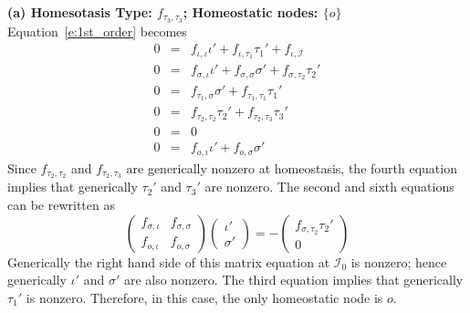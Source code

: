 \documentclass[a4paper,fleqn]{cas-dc}
\newcommand{\II}{{\mathcal I}}
\begin{document}
\noindent
\textbf{(a) Homesotasis Type: $f_{\tau_3,\tau_3}$; 
Homeostatic nodes: $\{o\}$}  \\
Equation~\eqref{e:1st_order} becomes
\begin{equation}  \label{e:1st_orderA}
\begin{array}{rcl}
0 & = & f_{\iota,\iota}\iota' + f_{\iota,\tau_1}\tau_1' + f_{\iota,\II} \\
0 & = & f_{\sigma,\iota}\iota' + f_{\sigma,\sigma}\sigma' + f_{\sigma,\tau_2}\tau_2' \\
0 & = & f_{\tau_1,\sigma}\sigma' + f_{\tau_1,\tau_1}\tau_1' \\
0 & = & f_{\tau_2,\tau_2}\tau_2' + f_{\tau_2,\tau_3}\tau_3' \\
0 & = & 0 \\
0 & = & f_{o,\iota}\iota' + f_{o,\sigma}\sigma'
\end{array}
\end{equation}
Since $f_{\tau_2,\tau_2}$ and $f_{\tau_2,\tau_3}$ are generically nonzero at homeostasis, the 
fourth equation implies that generically $\tau_2'$ and $\tau_3'$ are nonzero.
The second and sixth equations can be rewritten as
\[
\begin{pmatrix}
f_{\sigma,\iota} & f_{\sigma,\sigma} \\  f_{o,\iota} & f_{o,\sigma}
\end{pmatrix}
\begin{pmatrix}
\iota'  \\ \sigma'
\end{pmatrix}
= -\begin{pmatrix}
f_{\sigma,\tau_2}\tau_2' \\ 0
\end{pmatrix}
\]
Generically the right hand side of this matrix equation at $\II_0$ is nonzero; hence generically $\iota'$ and $\sigma'$ are also nonzero.  The third equation implies that generically $\tau_1'$ is nonzero.  Therefore, in this case, the only homeostatic node is $o$.

\medskip
\end{document}
